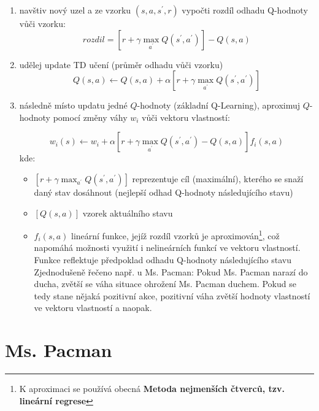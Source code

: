 \begin{enumerate}

\item navštiv nový uzel a ze vzorku $(s,a,s^\prime,r)$ vypočti rozdíl odhadu Q-hodnoty vůči vzorku:
\begin{displaymath}
 rozdil = \left [ r + \gamma \max_{a^\prime}Q(s^\prime,a^\prime) \right]  - Q(s,a) 
\end{displaymath}
\item udělej update TD učení (průměr odhadu vůči vzorku)
\begin{displaymath}
 Q(s,a) \leftarrow  Q(s,a) + \alpha \left [ r + \gamma \max_{a^\prime}Q(s^\prime,a^\prime) \right]
\end{displaymath}
\item následně místo updatu jedné $Q$-hodnoty (základní Q-Learning), aproximuj $Q$-hodnoty pomocí změny váhy $w_i$ vůči vektoru vlastností:

\begin{displaymath}
w_i(s) \leftarrow w_i + \alpha \left [ r + \gamma \max_{a^\prime}Q(s^\prime,a^\prime) - Q(s,a) \right] f_i(s,a)
\end{displaymath}
kde:
\begin{itemize}
	\item $\left [ r + \gamma \max_{a^\prime}Q(s^\prime,a^\prime)\right] $ reprezentuje cíl (maximální), kterého se snaží daný stav dosáhnout (nejlepší odhad Q-hodnoty následujícího stavu)
	\item $\left [ Q(s,a)\right]$ vzorek aktuálního stavu
	\item $f_i(s,a)$ lineární funkce, jejíž rozdíl vzorků je aproximován\footnote{K aproximaci se používá obecná \textbf{Metoda nejmenších čtverců, tzv. lineární regrese}}, což napomáhá možnosti využití i nelineárních funkcí ve vektoru vlastností. Funkce reflektuje předpoklad odhadu Q-hodnoty následujícího stavu\newline
	Zjednodušeně řečeno např. u Ms. Pacman: Pokud Ms. Pacman narazí do ducha, zvětší se váha situace ohrožení Ms. Pacman duchem. Pokud se tedy stane nějaká pozitivní akce, pozitivní váha zvětší hodnoty vlastností ve vektoru vlastností a naopak.
\end{itemize}

\end{enumerate}

\chapter{Ms. Pacman}
